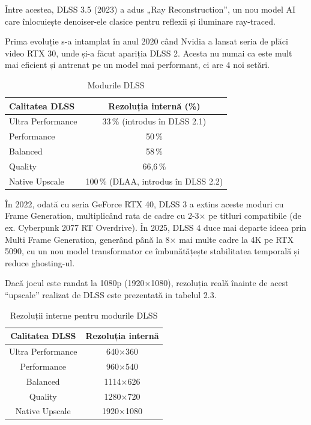 \noindent Între acestea, DLSS 3.5 (2023) a adus „Ray Reconstruction”, un nou model AI care înlocuiește denoiser-ele clasice pentru reflexii și iluminare ray-traced. 

Prima evoluție s-a intamplat în anul 2020 când Nvidia a lansat seria de plăci video RTX 30, unde și-a făcut apariția DLSS 2. Acesta nu numai ca este mult mai eficient și antrenat pe un model mai performant, ci are 4 noi setări.

\begin{table}[htbp]
  \centering
  \begin{tabular}{||l c||}
    \hline
    Calitatea DLSS & Rezoluția internă (\%) \\[0.5ex]
    \hline\hline
    Ultra Performance & 33\,\% (introdus în DLSS 2.1) \\
    \hline
    Performance       & 50\,\% \\
    \hline
    Balanced          & 58\,\% \\
    \hline
    Quality           & 66,6\,\% \\[1ex]
    \hline
    Native Upscale    & 100\,\% (DLAA, introdus în DLSS 2.2) \\[1ex]
    \hline
  \end{tabular}

  \caption{Modurile DLSS}
  \label{tab:dlss-res}
\end{table}



 În 2022, odată cu seria GeForce RTX 40, DLSS 3 a extins aceste moduri cu Frame Generation, multiplicând rata de cadre cu 2-3× pe titluri compatibile (de ex. Cyberpunk 2077 RT Overdrive). În 2025, DLSS 4 duce mai departe ideea prin Multi Frame Generation, generând până la 8× mai multe cadre la 4K pe RTX 5090, cu un nou model transformator ce îmbunătățește stabilitatea temporală și reduce ghosting-ul. 

Dacă jocul este randat la 1080p (1920×1080), rezoluția reală înainte de acest “upscale” realizat de DLSS este prezentată in tabelul 2.3.

\begin{table}[htbp]
  \centering
  \begin{tabular}{||c c||}
    \hline
    Calitatea DLSS & Rezoluția internă \\[0.5ex]
    \hline\hline
    Ultra Performance & 640×360 \\
    \hline
    Performance      & 960×540 \\
    \hline
    Balanced         & 1114×626 \\
    \hline
    Quality          & 1280×720 \\[1ex]
    \hline
    Native Upscale   & 1920×1080 \\[1ex]
    \hline
  \end{tabular}
  \caption{Rezoluții interne pentru modurile DLSS}
  \label{tab:dlss-res}
\end{table}



